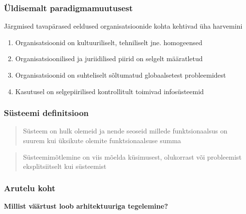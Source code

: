 \begin{frame}
	\frametitle{Üldisemalt paradigmamuutusest}
	
	Järgmised tavapärased eeldused organisatsioonide kohta kehtivad üha harvemini
	\begin{enumerate}
		
	  	\item Organisatsioonid on kultuuriliselt, tehniliselt jne. homogeensed

		\item Organisatsioonilised ja juriidilised piirid on selgelt määratletud

		\item Organisatsioonid on suhteliselt sõltumatud globaalsetest probleemidest
		\item Kasutusel on selgepiirilised kontrollitult toimivad infosüsteemid
	
  \end{enumerate}

\end{frame}

\begin{frame}[fragile]
  \frametitle{Süsteemi definitsioon}
		\begin{center}
  			\begin{quote}
				Süsteem on hulk olemeid ja nende seoseid millede funktsionaalsus on suurem kui üksikute olemite funktsionaalsuse summa
			\end{quote}
			\begin{quote}
				Süsteemimõtlemine on viis mõelda küsimusest, olukorrast või probleemist eksplitsiitselt kui süsteemist
			\end{quote}
		\end{center}
		\cite{crawley2015systems}
\end{frame}



\begin{frame}[fragile]
  \frametitle{Arutelu koht}
		\begin{center}
			\textbf{Millist väärtust loob arhitektuuriga tegelemine?}
		\end{center}
\end{frame}

